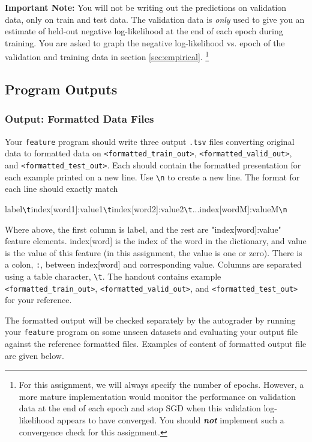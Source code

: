 \documentclass[11pt]{exam}
\numberwithin{equation}{section} %
\numberwithin{figure}{section} %
\numberwithin{table}{section} %
\begin{document}
\begin{notebox}
{\bf Important Note:} You will not be writing out the predictions on validation data, only on train and test data. The validation data is \emph{only} used to give you an estimate of held-out negative log-likelihood at the end of each epoch during training. You are asked to graph the negative log-likelihood vs. epoch of the validation and training data in section \ref{sec:empirical}. \footnote{For this assignment, we will always specify the number of epochs. However, a more mature implementation would monitor the performance on validation data at the end of each epoch and stop SGD when this validation log-likelihood appears to have converged. You should \textbf{ \emph{not}} implement such a convergence check for this assignment.} 
\end{notebox}

\subsection{Program Outputs}

\subsubsection{Output: Formatted Data Files} \label{format_output}
Your \lstinline{feature} program should write three output \texttt{.tsv} files converting original data to formatted data on \texttt{<formatted\_train\_out>}, \texttt{<formatted\_valid\_out>}, and \texttt{<formatted\_test\_out>}. Each should contain the formatted presentation for each example printed on a new line. Use \lstinline{\n} to create a new line. The format for each line should exactly match 

label\lstinline{\t}index[word1]:value1\lstinline{\t}index[word2]:value2\lstinline{\t}...index[wordM]:valueM\lstinline{\n}

Where above, the first column is label, and the rest are "index[word]:value" feature elements. index[word] is the index of the word in the dictionary, and value is the value of this feature (in this assignment, the value is one or zero). There is a colon, \lstinline{:}, between index[word] and corresponding value. Columns are separated using a table character, \lstinline{\t}. The handout contains example \texttt{<formatted\_train\_out>}, \newline \texttt{<formatted\_valid\_out>}, and \texttt{<formatted\_test\_out>} for your reference.

The formatted output will be checked separately by the autograder by running your \lstinline{feature} program on some unseen datasets and evaluating your output file against the reference formatted files. Examples of content of formatted output file are given below.
\end{document}
